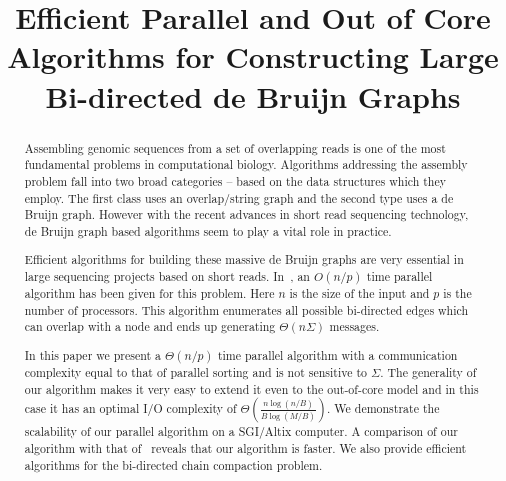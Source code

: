 \documentclass[11pt,conference,twocolumn]{IEEEtran}
\begin{document}
\title{Efficient Parallel and Out of Core Algorithms for Constructing Large Bi-directed de Bruijn Graphs}


\author{
}







\maketitle               

\begin{abstract}
Assembling genomic sequences from a set of overlapping reads is one of the
most fundamental problems in computational biology. Algorithms addressing the
assembly problem fall into two broad categories -- based on the data structures
which they employ. The first class uses an overlap/string graph and the second 
type uses a de Bruijn graph. However with the recent advances in short read 
sequencing technology, de Bruijn graph based algorithms seem to play a vital role in 
practice. 

Efficient algorithms for building these massive de Bruijn graphs are very essential 
in large sequencing projects based on short reads. In~\cite{par_bidirected_graph}, an $O(n/p)$ time parallel algorithm has been given for this problem. Here $n$ is the size of the input and $p$ is the number of processors. This algorithm enumerates all possible bi-directed
edges which can overlap with a node and ends up generating $\Theta(n\Sigma)$ messages. 

In this paper we  present a $\Theta(n/p)$ time parallel algorithm with a 
communication complexity equal to that of parallel sorting and is not sensitive to $\Sigma$. 
The generality of our algorithm makes it very easy to extend it even to the 
out-of-core model and in this case it has an optimal I/O complexity of $\Theta(\frac{n\log(n/B)}{B\log(M/B)})$. 
We demonstrate the scalability of our parallel algorithm on a SGI/Altix computer. A comparison of our algorithm with that of~\cite{par_bidirected_graph} reveals that our algorithm is faster. We also provide efficient algorithms for the
bi-directed chain compaction problem.
\end{abstract}
\end{document}
